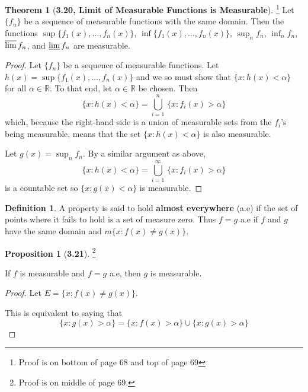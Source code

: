 \documentclass[12pt]{article}
\newcommand{\R}{\mathbb{R}}
\theoremstyle{definition}
\newtheorem*{thm}{Theorem}
\newtheorem*{definition}{Definition}
\newtheorem*{prop}{Proposition}
\begin{document}
\begin{thm}[\textbf{3.20, Limit of Measurable Functions is Measurable}]\footnote{Proof is on bottom of page 68 and top of page 69}
    Let \( \{ f_n \} \) be a sequence of measurable functions with the same domain. Then the functions \( \sup\{f_1(x), \ldots, f_n(x) \} \), \( \inf \{ f_1(x), \ldots, f_n(x)\}\), \( \sup_{n} f_n \), \( \inf_{n} f_n \), \( \varlimsup f_n \), and \( \varliminf f_n \) are measurable. 

        \begin{proof}
            Let \( \{ f_n\} \) be a sequence of measurable functions. Let \( h(x) = \sup\{f_1(x), \ldots, f_n(x) \} \) and we so must show that \( \{ x: h(x) < \alpha \}\) for all \( \alpha \in \R \). To that end, let \( \alpha \in \R \) be chosen. Then 
                \[
                     \{ x: h(x) < \alpha \} = \bigcup_{i=1}^{n} \, \{ x: f_i(x) > \alpha \}
                \]
            which, because the right-hand side is a union of measurable sets from the \( f_i \)'s being measurable, means that the set \( \{ x: h(x) < \alpha \}\)  is also measurable.

            Let \( g(x) = \sup_{n} f_n \). By a similar argument as above, 
                \[
                    \{ x: h(x) < \alpha \} = \bigcup_{i=1}^{\infty} \, \{ x: f_i(x) > \alpha \}  
                \]
            is a countable set so \( \{ x: g(x) < \alpha \}\) is measurable. 
        \end{proof}
\end{thm}

\begin{definition}
    A property is said to hold \textbf{almost everywhere} (a.e) if the set of points where it fails to hold is a set of measure zero. Thus \(f = g\) a.e if \( f \) and \( g \) have the same domain and \( m \{ x: f(x) \neq g(x) \} \). 
\end{definition}

\begin{prop}[\textbf{3.21}]\footnote{Proof is on middle of page 69.}

    If \( f \) is measurable and \( f =  g\) a.e, then \( g \) is measurable.

        \begin{proof}
            Let \( E = \{ x: f(x) \neq g(x) \} \). 
            
            This is equivalent to saying that     
                \[
                    \{ x: g(x) > \alpha \} = \{ x: f(x) > \alpha \} \cup \{ x: g(x) > \alpha \}
                \]
        \end{proof}
    
\end{prop}
\end{document}
